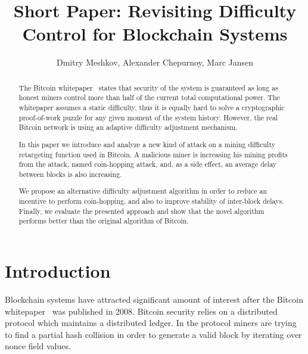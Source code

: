 \documentclass[]{llncs}
\begin{document}
\title{Short Paper: Revisiting Difficulty Control for Blockchain Systems}


\author{Dmitry Meshkov, Alexander Chepurnoy, Marc Jansen}


\maketitle

\begin{abstract}

The Bitcoin whitepaper~\cite{Nakamoto2008} states that security of the system is guaranteed as long as honest miners control more than half of the current total computational power. The whitepaper assumes a static difficulty, thus it is equally hard to solve a cryptographic proof-of-work puzzle for any given moment of the system history. However, the real Bitcoin network is using an adaptive difficulty adjustment mechanism.  

In this paper we introduce and analyze a new kind of attack on a mining difficulty retargeting function used in Bitcoin. A malicious miner is increasing his mining profits from the attack, named coin-hopping attack, and, as a side effect, an average delay between blocks is also increasing.

We propose an alternative difficulty adjustment algorithm in order to reduce an incentive to perform coin-hopping, and also to improve stability of inter-block delays. Finally, we evaluate the presented approach and show that the novel algorithm performs better than the original algorithm of Bitcoin.
	
\end{abstract}


\section{Introduction}
\label{sec:intro}

Blockchain systems have attracted significant amount of interest after the Bitcoin whitepaper~\cite{Nakamoto2008} was published in 2008.
Bitcoin security relies on a distributed protocol which maintains a distributed ledger. In the protocol miners are trying to find a partial hash collision in order to generate a valid block by iterating over nonce field values. 
\end{document}
